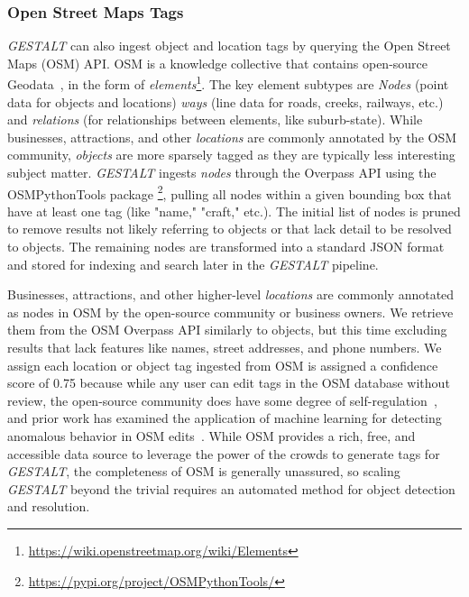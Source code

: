\subsubsection{Open Street Maps Tags}
\emph{GESTALT} can also ingest object and location tags by querying the Open Street Maps (OSM) API.
OSM is a knowledge collective that contains open-source Geodata~\cite{Haklay2008}, in the form of  \textit{elements}\footnote{\href{https://wiki.openstreetmap.org/wiki/Elements}{https://wiki.openstreetmap.org/wiki/Elements}}. 
The key element subtypes are \textit{Nodes} (point data for objects and locations) \textit{ways} (line data for roads, creeks, railways, etc.) and \textit{relations} (for relationships between elements, like suburb-state).
While businesses, attractions, and other \textit{locations} are commonly annotated by the OSM community, \textit{objects} are more sparsely tagged as they are typically less interesting subject matter. 
\emph{GESTALT} ingests \textit{nodes} through the Overpass API using the OSMPythonTools package \footnote{\href{https://pypi.org/project/OSMPythonTools/}{https://pypi.org/project/OSMPythonTools/}}, pulling all nodes within a given bounding box that have at least one tag (like "name," "craft," etc.).
The initial list of nodes is pruned to remove results not likely referring to objects or that lack detail to be resolved to objects.
The remaining nodes are transformed into a standard JSON format and stored for indexing and search later in the \emph{GESTALT} pipeline. 

Businesses, attractions, and other higher-level \textit{locations} are commonly annotated as nodes in OSM by the open-source community or business owners. 
We retrieve them from the OSM Overpass API similarly to objects, but this time excluding results that lack features like names, street addresses, and phone numbers. 
We assign each location or object tag ingested from OSM is assigned a confidence score of 0.75 because while any user can edit tags in the OSM database without review, the open-source community does have some degree of self-regulation~\cite{VargasMunoz2020}, and prior work has examined the application of machine learning for detecting anomalous behavior in OSM edits~\cite{Mooney2017}.
While OSM provides a rich, free, and accessible data source to leverage the power of the crowds to generate tags for \emph{GESTALT}, the completeness of OSM is generally unassured, so scaling \textit{GESTALT} beyond the trivial requires an automated method for object detection and resolution. 

